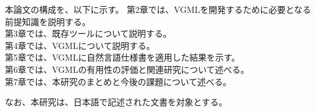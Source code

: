 本論文の構成を、以下に示す。
第2章では、VGMLを開発するために必要となる前提知識を説明する。\\
第3章では、既存ツールについて説明する。\\
第4章では、VGMLについて説明する。\\
第5章では、VGMLに自然言語仕様書を適用した結果を示す。\\
第6章では、VGMLの有用性の評価と関連研究について述べる。\\
第7章では、本研究のまとめと今後の課題について述べる。

なお、本研究は、日本語で記述された文書を対象とする。
